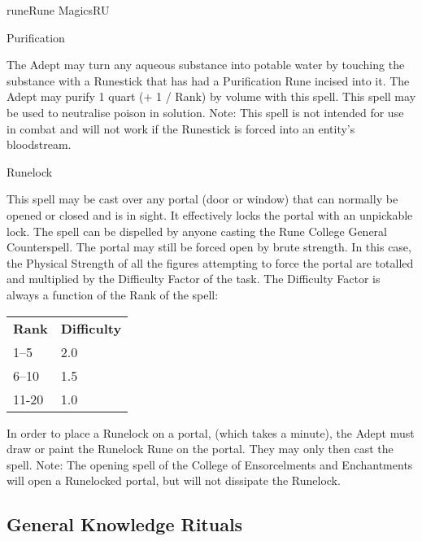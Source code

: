 \begin{college}[1.1]{rune}{Rune Magics}{RU}
\begin{spell}[G-8]{Purification}

\begin{effects}
The Adept may turn any aqueous substance into potable water by
touching the substance with a Runestick that has had a Purification
Rune incised into it.  The Adept may purify 1 quart (+ 1 / Rank) by
volume with this spell.  This spell may be used to neutralise poison
in solution.  Note: This spell is not intended for use in combat and
will not work if the Runestick is forced into an entity's bloodstream.
\end{effects}
\end{spell}

\begin{spell}[G-9]{Runelock}

\begin{effects}
This spell may be cast over any portal (door or window) that can
normally be opened or closed and is in sight.  It effectively locks
the portal with an unpickable lock.  The spell can be dispelled by
anyone casting the Rune College General Counterspell.  The portal may
still be forced open by brute strength.  In this case, the Physical
Strength of all the figures attempting to force the portal are
totalled and multiplied by the Difficulty Factor of the task.  The
Difficulty Factor is always a function of the Rank of the spell:

\begin{tabular}{ll}
\textbf{Rank} & \textbf{Difficulty} \\
1--5	& 2.0 \\
6--10	& 1.5 \\
11-20	& 1.0 \\
\end{tabular}

In order to place a Runelock on a portal, (which takes a minute), the
Adept must draw or paint the Runelock Rune on the portal. They may
only then cast the spell.  Note: The opening spell of the College of
Ensorcelments and Enchantments will open a Runelocked portal, but will
not dissipate the Runelock.
\end{effects}
\end{spell}

\subsection{General Knowledge Rituals}


\end{college}
